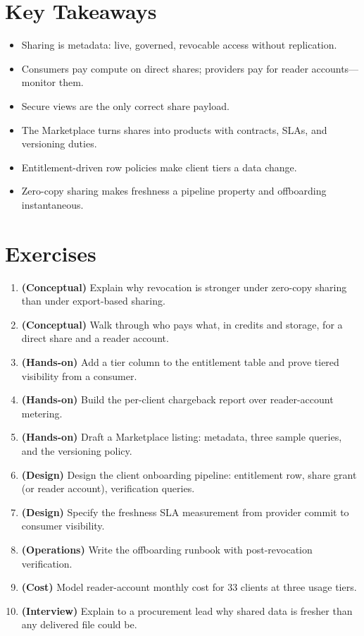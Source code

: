 \section*{Key Takeaways}
\begin{itemize}
    \item Sharing is metadata: live, governed, revocable access without replication.
    \item Consumers pay compute on direct shares; providers pay for reader accounts---monitor them.
    \item Secure views are the only correct share payload.
    \item The Marketplace turns shares into products with contracts, SLAs, and versioning duties.
    \item Entitlement-driven row policies make client tiers a data change.
    \item Zero-copy sharing makes freshness a pipeline property and offboarding instantaneous.
\end{itemize}

\section{Exercises}
\begin{enumerate}
    \item \textbf{(Conceptual)} Explain why revocation is stronger under zero-copy sharing than under export-based sharing.
    \item \textbf{(Conceptual)} Walk through who pays what, in credits and storage, for a direct share and a reader account.
    \item \textbf{(Hands-on)} Add a tier column to the entitlement table and prove tiered visibility from a consumer.
    \item \textbf{(Hands-on)} Build the per-client chargeback report over reader-account metering.
    \item \textbf{(Hands-on)} Draft a Marketplace listing: metadata, three sample queries, and the versioning policy.
    \item \textbf{(Design)} Design the client onboarding pipeline: entitlement row, share grant (or reader account), verification queries.
    \item \textbf{(Design)} Specify the freshness SLA measurement from provider commit to consumer visibility.
    \item \textbf{(Operations)} Write the offboarding runbook with post-revocation verification.
    \item \textbf{(Cost)} Model reader-account monthly cost for 33 clients at three usage tiers.
    \item \textbf{(Interview)} Explain to a procurement lead why shared data is fresher than any delivered file could be.
\end{enumerate}

